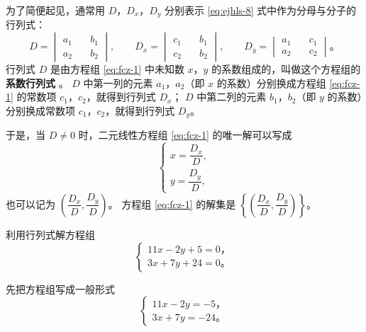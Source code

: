 为了简便起见，通常用 $D$，$D_x$，$D_y$ 分别表示 \eqref{eq:ejhls-8} 式中作为分母与分子的行列式：
$$
D = \begin{vmatrix}
    a_1 \quad & b_1 \\
    a_2 \quad & b_2
\end{vmatrix}, \qquad
D_x = \begin{vmatrix}
    c_1 \quad & b_1 \\
    c_2 \quad & b_2
\end{vmatrix}, \qquad
D_y = \begin{vmatrix}
    a_1 \quad & c_1 \\
    a_2 \quad & c_2
\end{vmatrix} \text{。}
$$
行列式 $D$ 是由方程组 \eqref{eq:fcz-1} 中未知数 $x$，$y$ 的系数组成的，叫做这个方程组的\textbf{系数行列式} 。
$D$ 中第一列的元素 $a_1$，$a_2$（即 $x$ 的系数）分别换成方程组 \eqref{eq:fcz-1} 的常数项 $c_1$，$c_2$，就得到行列式 $D_x$；
$D$ 中第二列的元素 $b_1$，$b_2$（即 $y$ 的系数）分别换成常数项 $c_1$，$c_2$，就得到行列式 $D_y$。

于是，当 $D \neq 0$ 时，二元线性方程组 \eqref{eq:fcz-1} 的唯一解可以写成
\begin{equation*}
    \begin{cases}
        x = \dfrac{D_x}{D}, \\[1.5em]
        y = \dfrac{D_y}{D},
    \end{cases} \tag{9}\label{eq:ejhls-9}
\end{equation*}
也可以记为 $\left( \dfrac{D_x}{D}, \dfrac{D_y}{D} \right)$。
方程组 \eqref{eq:fcz-1} 的解集是 $\left\{\left( \dfrac{D_x}{D}, \dfrac{D_y}{D} \right)\right\}$。


\setcounter{cntliti}{1}
\liti 利用行列式解方程组
$$\begin{cases}
    11x - 2y + 5 = 0 \text{，} \\
    3x + 7y + 24 = 0 \text{。}
\end{cases}$$

\jie 先把方程组写成一般形式
$$\begin{cases}
    11x - 2y = -5 \text{，} \\
    3x + 7y = -24 \text{。}
\end{cases}$$

